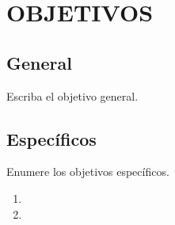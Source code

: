 \chapter*{OBJETIVOS}

\section*{General}
Escriba el objetivo general.


\section*{Específicos}
Enumere los objetivos específicos.
\begin{enumerate}
\item 
\item 
\end{enumerate}

